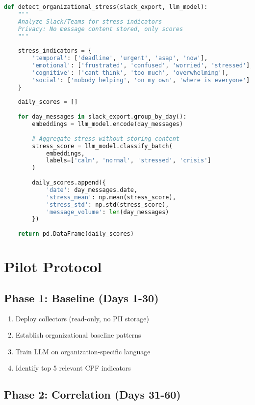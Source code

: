 \documentclass[11pt,a4paper]{article}
\begin{document}
\begin{lstlisting}[language=Python, caption=LLM-Based Stress Detection]
def detect_organizational_stress(slack_export, llm_model):
    """
    Analyze Slack/Teams for stress indicators
    Privacy: No message content stored, only scores
    """
    
    stress_indicators = {
        'temporal': ['deadline', 'urgent', 'asap', 'now'],
        'emotional': ['frustrated', 'confused', 'worried', 'stressed'],
        'cognitive': ['cant think', 'too much', 'overwhelming'],
        'social': ['nobody helping', 'on my own', 'where is everyone']
    }
    
    daily_scores = []
    
    for day_messages in slack_export.group_by_day():
        embeddings = llm_model.encode(day_messages)
        
        # Aggregate stress without storing content
        stress_score = llm_model.classify_batch(
            embeddings, 
            labels=['calm', 'normal', 'stressed', 'crisis']
        )
        
        daily_scores.append({
            'date': day_messages.date,
            'stress_mean': np.mean(stress_score),
            'stress_std': np.std(stress_score),
            'message_volume': len(day_messages)
        })
        
    return pd.DataFrame(daily_scores)
\end{lstlisting}

\section{Pilot Protocol}

\subsection{Phase 1: Baseline (Days 1-30)}

\begin{enumerate}
\item Deploy collectors (read-only, no PII storage)
\item Establish organizational baseline patterns
\item Train LLM on organization-specific language
\item Identify top 5 relevant CPF indicators
\end{enumerate}

\subsection{Phase 2: Correlation (Days 31-60)}
\end{document}
